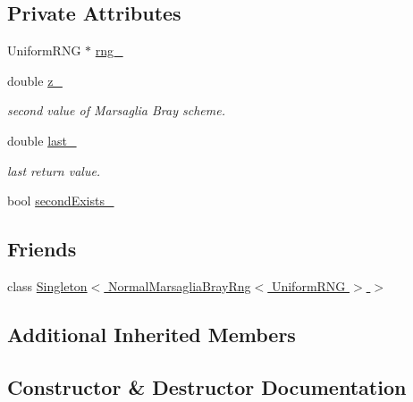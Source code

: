 \subsection*{Private Attributes}
\begin{DoxyCompactItemize}
\item 
Uniform\+R\+NG $\ast$ \hyperlink{class_normal_marsaglia_bray_rng_aa3741fc5dcca3f53aed89d2ec76d0402}{rng\+\_\+}
\item 
double \hyperlink{class_normal_marsaglia_bray_rng_a6d021a285cd0eb2d95c25cdb8af0ee93}{z\+\_\+}
\begin{DoxyCompactList}\small\item\em second value of Marsaglia Bray scheme. \end{DoxyCompactList}\item 
double \hyperlink{class_normal_marsaglia_bray_rng_a39a4a809c38812b344b3695b915133c6}{last\+\_\+}
\begin{DoxyCompactList}\small\item\em last return value. \end{DoxyCompactList}\item 
bool \hyperlink{class_normal_marsaglia_bray_rng_a6b795b729e795b1b81aa1b30d5dfe8ef}{second\+Exists\+\_\+}
\end{DoxyCompactItemize}
\subsection*{Friends}
\begin{DoxyCompactItemize}
\item 
class \hyperlink{class_normal_marsaglia_bray_rng_aa99df0c9327941ffb3d6995b103ce8c0}{Singleton$<$ Normal\+Marsaglia\+Bray\+Rng$<$ Uniform\+R\+N\+G $>$ $>$}
\end{DoxyCompactItemize}
\subsection*{Additional Inherited Members}


\subsection{Constructor \& Destructor Documentation}
\hypertarget{class_normal_marsaglia_bray_rng_a4d225dedc26e6dcf154a2902827b2ede}{}\label{class_normal_marsaglia_bray_rng_a4d225dedc26e6dcf154a2902827b2ede} 

